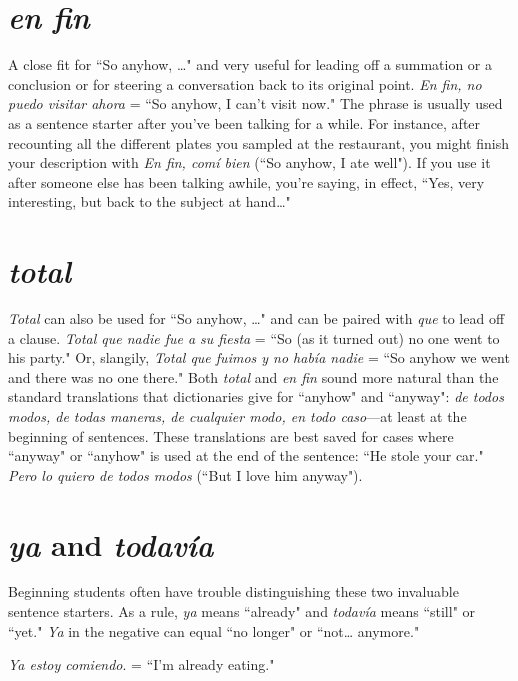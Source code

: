 \section{\emph{en fin}}

A close fit for ``So anyhow, \ldots{}" and very useful for leading off
a summation or a conclusion or for steering a conversation back to its
original point. \emph{En fin, no puedo visitar ahora} = ``So anyhow, I can't
visit now." The phrase is usually used as a sentence starter after you've
been talking for a while. For instance, after recounting all the different
plates you sampled at the restaurant, you might finish your description
with \emph{En fin, comí bien} (``So anyhow, I ate well"). If you use it after
someone else has been talking awhile, you're saying, in effect, ``Yes,
very interesting, but back to the subject at hand\ldots{}"

\section{\emph{total}}

\emph{Total} can also be used for ``So anyhow, \ldots{}" and can be paired
with \emph{que} to lead off a clause. \emph{Total que nadie fue a su fiesta} = ``So (as
it turned out) no one went to his party." Or, slangily, \emph{Total que fuimos
	y no había nadie} = ``So anyhow we went and there was no one there."
Both \emph{total} and \emph{en fin} sound more natural than the standard translations that dictionaries give for ``anyhow" and ``anyway": \emph{de todos modos, de todas maneras, de cualquier modo, en todo caso}---at least at
the beginning of sentences. These translations are best saved for cases
where ``anyway" or ``anyhow" is used at the end of the sentence:
``He stole your car." \emph{Pero lo quiero de todos modos} (``But I love him
anyway").

\section{\emph{ya} and \emph{todavía}}

Beginning students often have trouble distinguishing these
two invaluable sentence starters. As a rule, \emph{ya} means ``already" and \emph{todavía} means ``still" or ``yet." \emph{Ya} in the negative can equal ``no longer"
or ``not\ldots{} anymore."

\bsk

\indu \emph{Ya estoy comiendo}. = ``I'm already eating."

